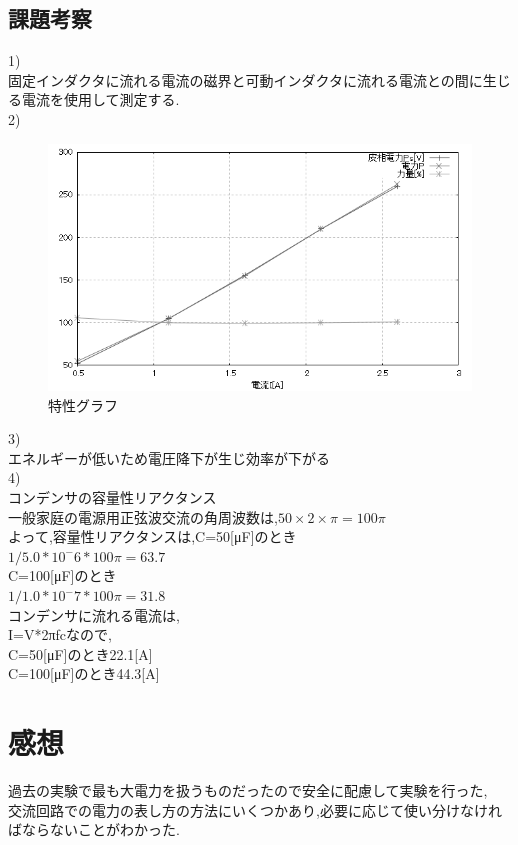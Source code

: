 \documentclass[titlepage]{jarticle}
\begin{document}
\subsection{課題考察}
1)\\
固定インダクタに流れる電流の磁界と可動インダクタに流れる電流との間に生じる電流を使用して測定する.\\
2)\\
\begin{figure}[H]
    \begin{center}
        \includegraphics[width=15cm]{graph/g1.PNG}
    \end{center}
    \caption{特性グラフ}
\end{figure}

3)\\
エネルギーが低いため電圧降下が生じ効率が下がる\\
4)\\
コンデンサの容量性リアクタンス\\
一般家庭の電源用正弦波交流の角周波数は,$50×2×π = 100π$\\
よって,容量性リアクタンスは,C=50[μF]のとき\\
$1/5.0*10^-6*100π = 63.7$\\
C=100[μF]のとき\\
$1/1.0*10^-7*100π = 31.8$\\

コンデンサに流れる電流は,\\
I=V*2πfcなので,\\
C=50[μF]のとき22.1[A]\\
C=100[μF]のとき44.3[A]\\


\section{感想}
過去の実験で最も大電力を扱うものだったので安全に配慮して実験を行った,\\
交流回路での電力の表し方の方法にいくつかあり,必要に応じて使い分けなければならないことがわかった.
\end{document}
